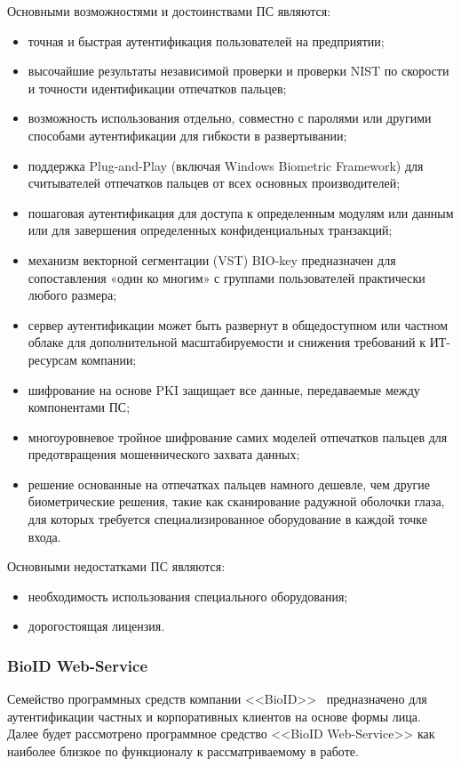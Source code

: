 Основными возможностями и достоинствами ПС являются:
\begin{itemize}
  \item точная и быстрая аутентификация пользователей на предприятии;
  \item высочайшие результаты независимой проверки и проверки NIST по скорости и точности идентификации отпечатков пальцев;
  \item возможность использования отдельно, совместно с паролями или другими способами аутентификации для гибкости в развертывании;
  \item поддержка Plug-and-Play (включая Windows Biometric Framework) для считывателей отпечатков пальцев от всех основных производителей;
  \item пошаговая аутентификация для доступа к определенным модулям или данным или для завершения определенных конфиденциальных транзакций;
  \item механизм векторной сегментации (VST) BIO-key предназначен для сопоставления «один ко многим» с группами пользователей практически любого размера;
  \item сервер аутентификации может быть развернут в общедоступном или частном облаке для дополнительной масштабируемости и снижения требований к ИТ-ресурсам компании;
  \item шифрование на основе PKI защищает все данные, передаваемые между компонентами ПС;
  \item многоуровневое тройное шифрование самих моделей отпечатков пальцев для предотвращения мошеннического захвата данных;
  \item решение основанные на отпечатках пальцев намного дешевле, чем другие биометрические решения, такие как сканирование радужной оболочки глаза, для которых требуется специализированное оборудование в каждой точке входа.
\end{itemize}

Основными недостатками ПС являются:
\begin{itemize}
  \item необходимость использования специального оборудования;
  \item дорогостоящая лицензия.
\end{itemize}

\subsubsection{BioID Web-Service}
\label{sub:domain:analogs:bioId}
Семейство программных средств компании <<BioID>>~\cite{analogs_bioid} предназначено для аутентификации частных и корпоративных клиентов на основе формы лица. Далее будет рассмотрено программное средство <<BioID Web-Service>> как наиболее близкое по функционалу к рассматриваемому в работе.

